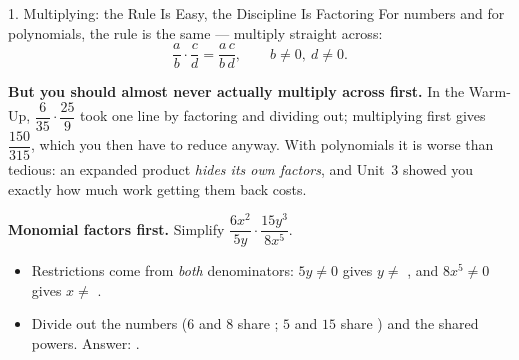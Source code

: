 \documentclass[10pt]{article}
\begin{document}
\begin{notesbox}{1. Multiplying: the Rule Is Easy, the Discipline Is Factoring}
For numbers and for polynomials, the rule is the same --- multiply straight across:
\[
  \frac{a}{b}\cdot\frac{c}{d}=\frac{a\,c}{b\,d}, \qquad b\neq0,\ d\neq0 .
\]

\vspace{3pt}
\textbf{But you should almost never actually multiply across first.} In the Warm-Up,
$\dfrac{6}{35}\cdot\dfrac{25}{9}$ took one line by factoring and dividing out; multiplying first gives
$\dfrac{150}{315}$, which you then have to reduce anyway. With polynomials it is worse than tedious:
an expanded product \emph{hides its own factors}, and Unit~3 showed you exactly how much work getting
them back costs.

\vspace{3pt}
\begin{center}
\end{center}

\vspace{4pt}
\textbf{Monomial factors first.} Simplify $\dfrac{6x^2}{5y}\cdot\dfrac{15y^3}{8x^5}$.
\begin{itemize}[leftmargin=1.5em, itemsep=3pt]
  \item Restrictions come from \emph{both} denominators: $5y\neq0$ gives $y\neq$ , and
        $8x^5\neq0$ gives $x\neq$ .
  \item Divide out the numbers ($6$ and $8$ share ; $5$ and $15$ share )
        and the shared powers. Answer: .
\end{itemize}
\end{notesbox}
\end{document}
